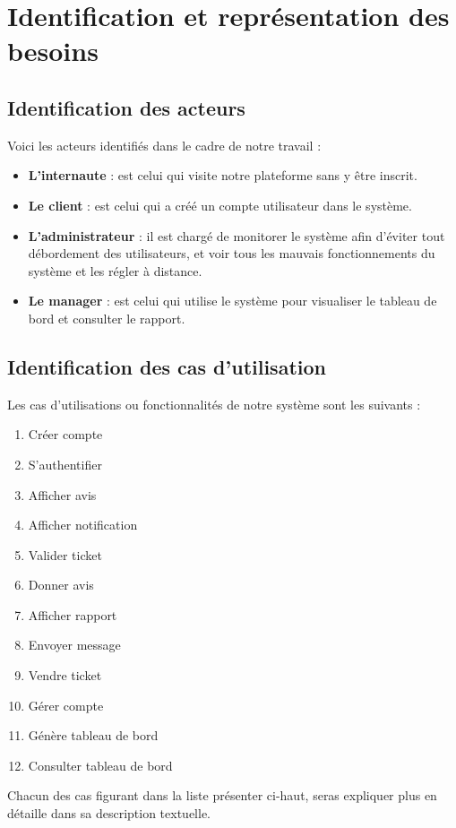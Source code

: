 \section[Identification et représentation des besoins]{Identification et représentation des besoins}    
    \subsection[Identification des acteurs]{Identification des acteurs}
    Voici les acteurs identifiés dans le cadre de notre
    travail :
    \par
        \begin{itemize}
            \setlength{\itemsep}{0pt}
            \item [\ding{226}] \textbf{L’internaute} : est celui qui visite
            notre plateforme sans y être inscrit.
            \item [\ding{226}] \textbf{Le client} : est celui qui a créé un compte
            utilisateur dans le système.
            \item [\ding{226}] \textbf{L’administrateur} : il est chargé de
            monitorer le système afin d’éviter tout débordement des utilisateurs,
            et voir tous les mauvais fonctionnements du système et les régler
            à distance.
            \item [\ding{226}] \textbf{Le manager} : est celui qui utilise le système
            pour visualiser le tableau de bord et consulter le rapport.
        \end{itemize}
    \subsection[Identification des cas d’utilisation]{Identification des cas d’utilisation}
    Les cas d’utilisations ou fonctionnalités de notre
    système sont les suivants :
    \par
        \begin{enumerate}
            \setlength{\itemsep}{0pt}
            \item Créer compte
            \item S’authentifier
            \item Afficher avis
            \item Afficher notification
            \item Valider ticket
            \item Donner avis
            \item Afficher rapport
            \item Envoyer message
            \item Vendre ticket
            \item Gérer compte
            \item Génère tableau de bord
            \item Consulter tableau de bord
        \end{enumerate}
    Chacun des cas figurant dans la liste présenter
    ci-haut, seras expliquer plus en détaille dans
    sa description textuelle.
\pagebreak
